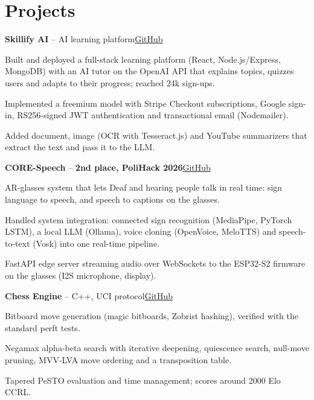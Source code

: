 \documentclass[a4paper,11pt]{article}
\newcommand{\project}[3]{\noindent\textbf{#1} #2\hfill #3\par}
\begin{document}
\section{Projects}

\project{Skillify AI}{-- AI learning platform}{\href{https://github.com/Tudor810/Skillify}{GitHub}}
\begin{bullets}
\item Built and deployed a full-stack learning platform (React, Node.js/Express, MongoDB) with an AI tutor on the OpenAI API that explains topics, quizzes users and adapts to their progress; reached 24k sign-ups.
\item Implemented a freemium model with Stripe Checkout subscriptions, Google sign-in, RS256-signed JWT authentication and transactional email (Nodemailer).
\item Added document, image (OCR with Tesseract.js) and YouTube summarizers that extract the text and pass it to the LLM.
\end{bullets}

\project{CORE-Speech}{-- \textbf{2nd place, PoliHack 2026}}{\href{https://github.com/Tudor810/CORE-Speech}{GitHub}}
\begin{bullets}
\item AR-glasses system that lets Deaf and hearing people talk in real time: sign language to speech, and speech to captions on the glasses.
\item Handled system integration: connected sign recognition (MediaPipe, PyTorch LSTM), a local LLM (Ollama), voice cloning (OpenVoice, MeloTTS) and speech-to-text (Vosk) into one real-time pipeline.
\item FastAPI edge server streaming audio over WebSockets to the ESP32-S2 firmware on the glasses (I2S microphone, display).
\end{bullets}

\project{Chess Engine}{-- C++, UCI protocol}{\href{https://github.com/Tudor810/ChessEngine}{GitHub}}
\begin{bullets}
\item Bitboard move generation (magic bitboards, Zobrist hashing), verified with the standard perft tests.
\item Negamax alpha-beta search with iterative deepening, quiescence search, null-move pruning, MVV-LVA move ordering and a transposition table.
\item Tapered PeSTO evaluation and time management; scores around 2000 Elo CCRL.
\end{bullets}
\end{document}
